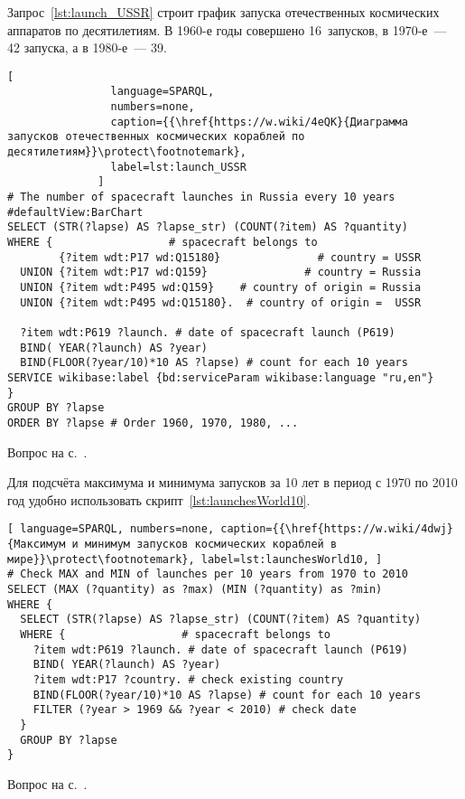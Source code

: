 \begin{task}
\label{answer:launches_USSR}
Запрос~\ref{lst:launch_USSR} строит график запуска отечественных космических аппаратов по десятилетиям.
    В 1960-е годы совершено 16~запусков, в 1970-е~--- 42 запуска, а в 1980-е~--- 39.%

\begin{lstlisting}[ 
                language=SPARQL, 
                numbers=none, 
                caption={{\href{https://w.wiki/4eQK}{Диаграмма запусков отечественных космических кораблей по десятилетиям}}\protect\footnotemark}, 
                label=lst:launch_USSR
              ]
# The number of spacecraft launches in Russia every 10 years
#defaultView:BarChart
SELECT (STR(?lapse) AS ?lapse_str) (COUNT(?item) AS ?quantity)
WHERE {                  # spacecraft belongs to
        {?item wdt:P17 wd:Q15180}               # country = USSR
  UNION {?item wdt:P17 wd:Q159}               # country = Russia
  UNION {?item wdt:P495 wd:Q159}    # country of origin = Russia
  UNION {?item wdt:P495 wd:Q15180}.  # country of origin =  USSR
  
  ?item wdt:P619 ?launch. # date of spacecraft launch (P619)
  BIND( YEAR(?launch) AS ?year) 
  BIND(FLOOR(?year/10)*10 AS ?lapse) # count for each 10 years
SERVICE wikibase:label {bd:serviceParam wikibase:language "ru,en"}
} 
GROUP BY ?lapse
ORDER BY ?lapse # Order 1960, 1970, 1980, ...
\end{lstlisting}

\small{\AnswerBackref Вопрос на с.~\pageref{question:spacecraft_1}.}
\end{task}


\begin{task}
    Для подсчёта максимума и минимума запусков за 10 лет в период с 1970 по 2010 год удобно использовать скрипт~\ref{lst:launchesWorld10}.
    \begin{lstlisting}[ language=SPARQL, numbers=none, caption={{\href{https://w.wiki/4dwj}{Максимум и минимум запусков космических кораблей в мире}}\protect\footnotemark}, label=lst:launchesWorld10, ]
# Check MAX and MIN of launches per 10 years from 1970 to 2010
SELECT (MAX (?quantity) as ?max) (MIN (?quantity) as ?min)
WHERE {
  SELECT (STR(?lapse) AS ?lapse_str) (COUNT(?item) AS ?quantity)
  WHERE {                  # spacecraft belongs to
    ?item wdt:P619 ?launch. # date of spacecraft launch (P619)
    BIND( YEAR(?launch) AS ?year) 
    ?item wdt:P17 ?country. # check existing country
    BIND(FLOOR(?year/10)*10 AS ?lapse) # count for each 10 years
    FILTER (?year > 1969 && ?year < 2010) # check date
  } 
  GROUP BY ?lapse
} \end{lstlisting}
    \small{\AnswerBackref Вопрос на с.~\pageref{question:spacecraft_2}.}
\label{answer:max-min-space-launches}
\end{task}


